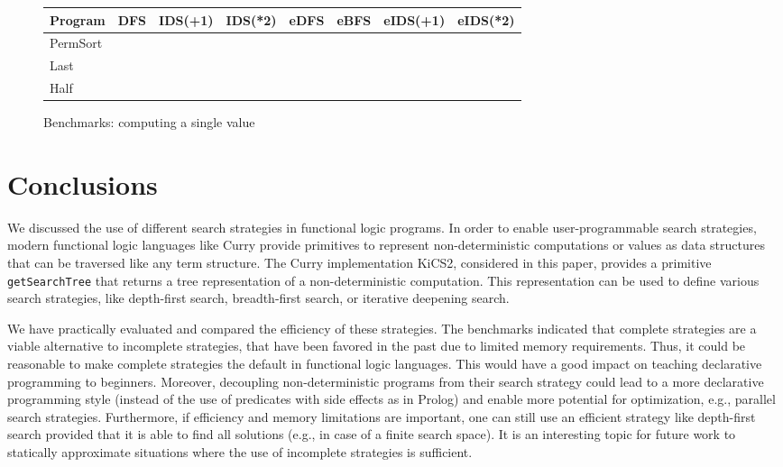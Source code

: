 \documentclass[english]{lni}
\newcommand{\code}[1]{\texttt{\small{}#1}}
\begin{document}
\begin{figure}[ht]
\centering
\begin{tabular}{|@{~~}l@{~~}|*{7}{@{~~}r@{~~}|}}
\hline
Program &   DFS  & IDS(+1) & IDS(*2) & eDFS & eBFS & eIDS(+1) & eIDS(*2) \\\hline
PermSort  &     \\
Last      &     \\
Half      &     \\
\hline
\end{tabular}
\caption{Benchmarks: computing a single value}
\label{fig:bench-first-solution}
\end{figure}


\section{Conclusions}
\label{sec:conclusions}

We discussed the use of different search strategies
in functional logic programs.
In order to enable user-programmable search strategies,
modern functional logic languages like Curry
provide primitives to represent non-deterministic computations
or values as data structures that can be traversed like
any term structure.
The Curry implementation KiCS2, considered in this paper,
provides a primitive \code{getSearchTree}
that returns a tree representation of a non-deterministic computation.
This representation can be used to define various search strategies,
like depth-first search, breadth-first search, or iterative deepening
search.

We have practically evaluated and compared
the efficiency of these strategies.
The benchmarks indicated that complete strategies
are a viable alternative to incomplete strategies,
that have been favored in the past due to limited memory requirements.
Thus, it could be reasonable to make
complete strategies the default in functional logic languages.
This would have a good impact on teaching declarative programming
to beginners.
Moreover, decoupling non-deterministic programs
from their search strategy could lead to a more declarative
programming style (instead of the use of predicates with
side effects as in Prolog) and enable more potential for
optimization, e.g., parallel search strategies.
Furthermore, if efficiency and memory limitations are important,
one can still use an efficient strategy like depth-first search
provided that it is able to find all solutions
(e.g., in case of a finite search space).
It is an interesting topic for future work
to statically approximate situations where
the use of incomplete strategies is sufficient.


%

\end{document}
